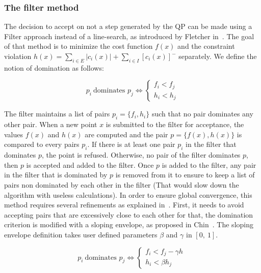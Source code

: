 \subsubsection{The filter method}
\label{ssub:the_filter_method}
The decision to accept on not a step generated by the QP can be made using a Filter approach instead of a line-search, as introduced by Fletcher in~\cite{fletcher:mathprog:2000}.
The goal of that method is to minimize the cost function $f(x)$ and the constraint violation $h(x) = \sum_{i\in E}{|c_i(x)|} + \sum_{i\in I}{{[c_i(x)]}^-}$ separately.
We define the notion of domination as follows:

\begin{definition}
  \begin{equation}
    p_i\ \text{dominates }p_j \Leftrightarrow \left\{
        \begin{array}{l}
    f_i < f_j \\
    h_i < h_j
  \end{array}  \right.
  \end{equation}
\end{definition}

The filter maintains a list of pairs $p_i=\{f_i, h_i\}$ such that no pair dominates any other pair.
When a new point $x$ is submitted to the filter for acceptance, the values $f(x)$ and $h(x)$ are computed and the pair $p = \{f(x), h(x)\}$ is compared to every pairs $p_i$.
If there is at least one pair $p_i$ in the filter that dominates $p$, the point is refused.
Otherwise, no pair of the filter dominates $p$, then $p$ is accepted and added to the filter.
Once $p$ is added to the filter, any pair in the filter that is dominated by $p$ is removed from it to ensure to keep a list of pairs non dominated by each other in the filter (That would slow down the algorithm with useless calculations).
In order to ensure global convergence, this method requires several refinements as explained in~\cite{fletcher:mathprog:2000}.
First, it needs to avoid accepting pairs that are excessively close to each other for that, the domination criterion is modified with a sloping envelope, as proposed in Chin~\cite{chin:mathprog:2003}.
The sloping envelope definition takes user defined parameters $\beta$ and $\gamma$ in $[0,\ 1]$.

\begin{definition}
  \begin{equation}
    p_i\ \text{dominates }p_j \Leftrightarrow \left\{
        \begin{array}{l}
    f_i < f_j - \gamma h\ \\
    h_i < \beta h_j
  \end{array}  \right.
  \end{equation}
\end{definition}


